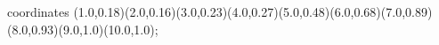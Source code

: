					coordinates { (1.0,0.18)(2.0,0.16)(3.0,0.23)(4.0,0.27)(5.0,0.48)(6.0,0.68)(7.0,0.89)(8.0,0.93)(9.0,1.0)(10.0,1.0)};